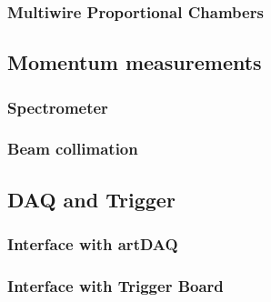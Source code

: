 \subsubsection{Multiwire Proportional Chambers}

\subsection{Momentum measurements}

\subsubsection{Spectrometer}

\subsubsection{Beam collimation}

\subsection{DAQ and Trigger}

\subsubsection{Interface with artDAQ}

\subsubsection{Interface with Trigger Board}





